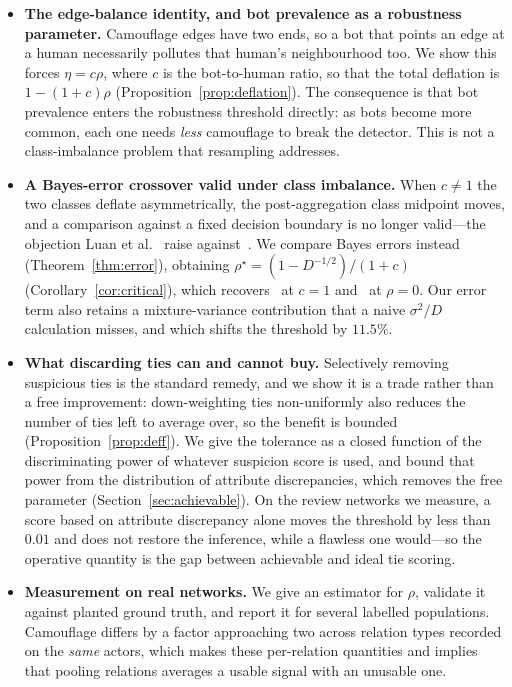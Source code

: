 \documentclass[../elsevier.tex]{subfiles}
\begin{document}
\begin{itemize}
    \item \textbf{The edge-balance identity, and bot prevalence as a robustness
    parameter.} Camouflage edges have two ends, so a bot that points an edge at a
    human necessarily pollutes that human's neighbourhood too. We show this forces
    $\eta = c\rho$, where $c$ is the bot-to-human ratio, so that the total deflation
    is $1-(1+c)\rho$ (Proposition~\ref{prop:deflation}). The consequence is that
    bot prevalence enters the robustness threshold directly: as bots become more
    common, each one needs \emph{less} camouflage to break the detector. This is not
    a class-imbalance problem that resampling addresses.

    \item \textbf{A Bayes-error crossover valid under class imbalance.} When
    $c \neq 1$ the two classes deflate asymmetrically, the post-aggregation class
    midpoint moves, and a comparison against a fixed decision boundary is no longer
    valid---the objection Luan et al.~\citeyearpar{luan2023when} raise
    against~\citep{ma2022homophily}. We compare Bayes errors instead
    (Theorem~\ref{thm:error}), obtaining
    $\rho^\star = (1 - D^{-1/2})/(1+c)$ (Corollary~\ref{cor:critical}), which
    recovers~\citep{ma2022homophily} at $c=1$ and~\citep{baranwal2021graph} at
    $\rho=0$. Our error term also retains a mixture-variance contribution that a
    naive $\sigma^2/D$ calculation misses, and which shifts the threshold by $11.5\%$.

    \item \textbf{What discarding ties can and cannot buy.} Selectively removing
    suspicious ties is the standard remedy, and we show it is a trade rather than a
    free improvement: down-weighting ties non-uniformly also reduces the number of
    ties left to average over, so the benefit is bounded
    (Proposition~\ref{prop:deff}). We give the tolerance as a closed function of the
    discriminating power of whatever suspicion score is used, and bound that power
    from the distribution of attribute discrepancies, which removes the free parameter
    (Section~\ref{sec:achievable}). On the review networks we measure, a score based on
    attribute discrepancy alone moves the threshold by less than $0.01$ and does not
    restore the inference, while a flawless one would---so the operative quantity is
    the gap between achievable and ideal tie scoring.

    \item \textbf{Measurement on real networks.} We give an estimator for $\rho$,
    validate it against planted ground truth, and report it for several labelled
    populations. Camouflage differs by a factor approaching two across relation types
    recorded on the \emph{same} actors, which makes these per-relation quantities and
    implies that pooling relations averages a usable signal with an unusable one.
\end{itemize}
\end{document}
